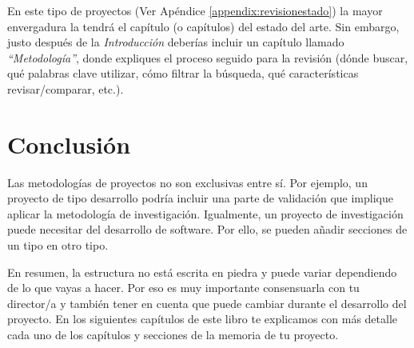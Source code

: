 En este tipo de proyectos (Ver Apéndice  \ref{appendix:revisionestado}) la mayor envergadura la tendrá el capítulo (o capítulos) del estado del arte. Sin embargo, justo después de la \textit{Introducción} deberías incluir un capítulo llamado \textit{``Metodología''}, donde expliques el proceso seguido para la revisión (dónde buscar, qué palabras clave utilizar, cómo filtrar la búsqueda, qué características revisar/comparar, etc.).


\section{Conclusión}

 Las metodologías de proyectos no son exclusivas entre sí.  Por ejemplo, un proyecto de tipo desarrollo podría incluir una parte de validación que implique aplicar la metodología de investigación. Igualmente, un proyecto de investigación puede necesitar del desarrollo de software. Por ello, se pueden añadir secciones de un tipo en otro tipo.

En resumen, la estructura no está escrita en piedra y puede variar dependiendo de lo que vayas a hacer. Por eso es muy importante consensuarla con tu director/a y también tener en cuenta que puede cambiar durante el desarrollo del proyecto. En los siguientes capítulos de este libro te explicamos con más detalle cada uno de los capítulos y secciones de la memoria de tu proyecto.

